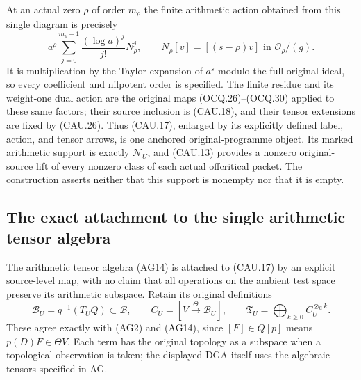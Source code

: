 At an actual zero $\rho$ of order $m_\rho$ the finite arithmetic
action obtained from this single diagram is precisely
\[
 a^\rho\sum_{j=0}^{m_\rho-1}
            \frac{(\log a)^j}{j!}N_\rho^j,
 \qquad N_\rho[v]=[(s-\rho)v]\text{ in }\mathcal O_\rho/(g).
                                                               \tag{CAU.33}
\]
It is multiplication by the Taylor expansion of $a^s$ modulo the
full original ideal, so every coefficient and nilpotent order is
specified.  The finite residue and its weight-one dual action are the
original maps (OCQ.26)--(OCQ.30) applied to these same factors; their
source inclusion is (CAU.18), and their tensor extensions are fixed
by (CAU.26).  Thus (CAU.17), enlarged by its explicitly defined label,
action, and tensor arrows, is one anchored original-programme object.
Its marked arithmetic support is exactly $\mathcal N_U$, and (CAU.13)
provides a nonzero original-source lift of every nonzero class of each
actual offcritical packet.  The construction asserts neither that this
support is nonempty nor that it is empty.

\subsection{The exact attachment to the single arithmetic tensor algebra}

The arithmetic tensor algebra (AG14) is attached to (CAU.17) by an
explicit source-level map, with no claim that all operations on the
ambient test space preserve its arithmetic subspace.  Retain its
original definitions
\[
 \mathscr B_U=q^{-1}(T_UQ)\subset\mathscr B,\qquad
 C_U=[V\xrightarrow{\Theta}\mathscr B_U],\qquad
 \mathfrak T_U=\bigoplus_{k\ge0}C_U^{\otimes_{\mathbb C}k}.
                                                               \tag{CAU.34}
\]
These agree exactly with (AG2) and (AG14), since $[F]\in Q[p]$ means
$p(D)F\in\Theta V$.  Each term has the original topology as a
subspace when a topological observation is taken; the displayed DGA
itself uses the algebraic tensors specified in AG.

